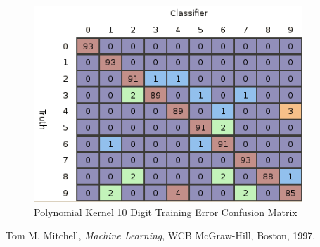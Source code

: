 \documentclass{article}
\begin{document}
\begin{figure}
\centering
\includegraphics[width=0.9\textwidth]{images/poly_all_confusion_training.png}
\caption{Polynomial Kernel 10 Digit Training Error Confusion Matrix}
\label{poly10trainconfusion}
\end{figure}



\begin{thebibliography}{9}

  Tom M. Mitchell,
  \emph{Machine Learning},
  WCB McGraw-Hill, Boston,
  1997.

\end{thebibliography}
\end{document}
